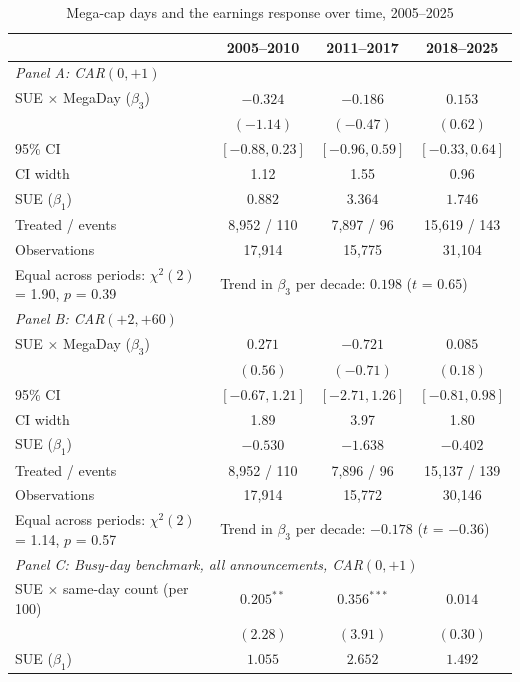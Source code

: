 \begin{table}[htbp]
\centering
\small
\caption{Mega-cap days and the earnings response over time, 2005--2025}
\label{tab:over_time}
\begin{tabular}{lccc}
\toprule
 & 2005--2010 & 2011--2017 & 2018--2025 \\
\midrule
\multicolumn{4}{l}{\emph{Panel A: CAR$(0,+1)$}} \\
SUE $\times$ MegaDay ($\beta_3$) & $-0.324$ & $-0.186$ & $0.153$ \\
 & $(-1.14)$ & $(-0.47)$ & $(0.62)$ \\
95\% CI & $[-0.88, 0.23]$ & $[-0.96, 0.59]$ & $[-0.33, 0.64]$ \\
CI width & 1.12 & 1.55 & 0.96 \\
SUE ($\beta_1$) & $0.882$ & $3.364$ & $1.746$ \\
Treated / events & 8,952 / 110 & 7,897 / 96 & 15,619 / 143 \\
Observations & 17,914 & 15,775 & 31,104 \\
Equal across periods: $\chi^2(2)$ = 1.90, $p$ = 0.39 & \multicolumn{3}{l}{Trend in $\beta_3$ per decade: $0.198$ ($t$ = $0.65$)} \\[2pt]
\midrule
\multicolumn{4}{l}{\emph{Panel B: CAR$(+2,+60)$}} \\
SUE $\times$ MegaDay ($\beta_3$) & $0.271$ & $-0.721$ & $0.085$ \\
 & $(0.56)$ & $(-0.71)$ & $(0.18)$ \\
95\% CI & $[-0.67, 1.21]$ & $[-2.71, 1.26]$ & $[-0.81, 0.98]$ \\
CI width & 1.89 & 3.97 & 1.80 \\
SUE ($\beta_1$) & $-0.530$ & $-1.638$ & $-0.402$ \\
Treated / events & 8,952 / 110 & 7,896 / 96 & 15,137 / 139 \\
Observations & 17,914 & 15,772 & 30,146 \\
Equal across periods: $\chi^2(2)$ = 1.14, $p$ = 0.57 & \multicolumn{3}{l}{Trend in $\beta_3$ per decade: $-0.178$ ($t$ = $-0.36$)} \\[2pt]
\midrule
\multicolumn{4}{l}{\emph{Panel C: Busy-day benchmark, all announcements, CAR$(0,+1)$}} \\
SUE $\times$ same-day count (per 100) & $0.205^{**}$ & $0.356^{***}$ & $0.014$ \\
 & $(2.28)$ & $(3.91)$ & $(0.30)$ \\
SUE ($\beta_1$) & $1.055$ & $2.652$ & $1.492$ \\

\end{tabular}
\end{table}
